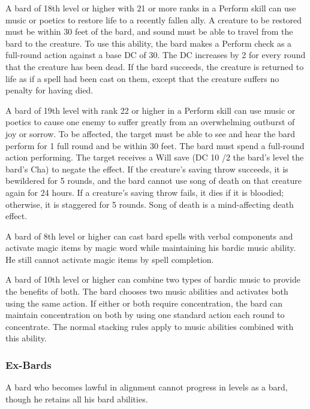   A bard of 18th level or higher with 21 or more ranks in a Perform skill can use music or poetics to restore life to a recently fallen ally. A creature to be restored must be within 30 feet of the bard, and sound must be able to travel from the bard to the creature. To use this ability, the bard makes a Perform check as a full-round action against a base DC of 30. The DC increases by 2 for every round that the creature has been dead. If the bard succeeds, the creature is returned to life as if a  spell had been cast on them, except that the creature suffers no penalty for having died.

 A bard of 19th level with rank 22 or higher in a Perform skill can use music or poetics to cause one enemy to suffer greatly from an overwhelming outburst of joy or sorrow. To be affected, the target must be able to see and hear the bard perform for 1 full round and be within 30 feet. The bard must spend a full-round action performing. The target receives a Will save (DC 10 /2 the bard's level \add the bard's Cha) to negate the effect. If the creature's saving throw succeeds, it is bewildered for 5 rounds, and the bard cannot use song of death on that creature again for 24 hours. If a creature's saving throw fails, it dies if it is bloodied; otherwise, it is staggered for 5 rounds. Song of death is a mind-affecting death effect.

 A bard of 8th level or higher can cast bard spells with verbal components and activate magic items by magic word while maintaining his bardic music ability. He still cannot activate magic items by spell completion.

 A bard of 10th level or higher can combine two types of bardic
music to provide the benefits of both. The bard chooses two music abilities and activates both
using the same action. If either or both require concentration, the bard can maintain
concentration on both by using one standard action each round to concentrate. The normal stacking
rules apply to music abilities combined with this ability.
\subsubsection{Ex-Bards}
A bard who becomes lawful in alignment cannot progress in levels as a bard, though he retains all his bard abilities.

